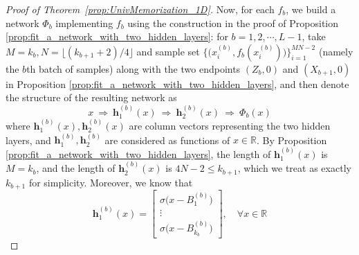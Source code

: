 \documentclass{article}
\numberwithin{equation}{section}
\theoremstyle{definition}
\begin{document}
\begin{proof}[{Proof of Theorem~\ref{prop:UnivMemorization_1D}}]
Now, for each $f_b$, we build a network $\Phi_b$ implementing $f_b$ using the construction in the proof of Proposition \ref{prop:fit_a_network_with_two_hidden_layers}: for $b=1,2,\cdots,L-1$, take $M=k_b,N= \lfloor (k_{b+1}+2)/4 \rfloor$ and sample set $\big\{\big(x_i^{(b)}, f_b(x_i^{(b)})\big)\big\}_{i=1}^{MN-2}$ (namely the $b$th batch of samples) along with the two endpoints $(Z_b,0)$ and $(X_{b+1},0)$ in Proposition \ref{prop:fit_a_network_with_two_hidden_layers}, and then denote the structure of the resulting network as
\[
    x
    \ \Longrightarrow \ 
    \mathbf{h}_1^{(b)}(x) 
    \ \Longrightarrow \ 
    \mathbf{h}_2^{(b)}(x) 
    \ \Longrightarrow \ 
    \Phi_b(x)
\]
where $\mathbf{h}_1^{(b)}(x),\mathbf{h}_2^{(b)}(x)$ are column vectors representing the two hidden layers, and $\mathbf{h}_1^{(b)},\mathbf{h}_2^{(b)}$ are considered as functions of $x\in\mathbb{R}$. By Proposition \ref{prop:fit_a_network_with_two_hidden_layers}, the length of $\mathbf{h}_1^{(b)}(x)$ is $M=k_b$, and the length of $\mathbf{h}_2^{(b)}(x)$ is $4N-2 \le k_{b+1}$, which we treat as exactly $k_{b+1}$ for simplicity. Moreover, we know that 
\[
    \mathbf{h}_1^{(b)}(x) = 
    \begin{bmatrix}
        \sigma\big(x - B_1^{(b)}\big)  \\
        \vdots  \\
        \sigma\big(x - B_{k_b}^{(b)}\big)
    \end{bmatrix},
    \quad \forall x \in \mathbb{R}
\]


\end{proof}
\end{document}
